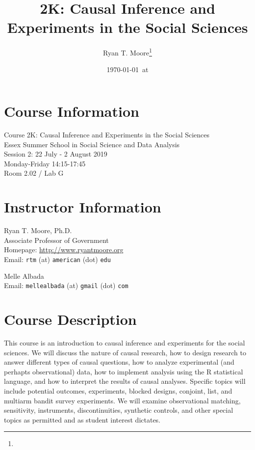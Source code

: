\documentclass[11pt]{article}
\title{2K: Causal Inference and Experiments in the Social Sciences}
\author{Ryan T. Moore\footnote{\rtmaddr}}
\date{\today~at \xxivtime}
\begin{document}
\maketitle

\section*{Course Information}
Course 2K: Causal Inference and Experiments in the Social Sciences\\
Essex Summer School in Social Science and Data Analysis\\
Session 2: 22 July - 2 August 2019\\
Monday-Friday 14:15-17:45\\
Room 2.02 / Lab G\\

\section*{Instructor Information}
Ryan T. Moore, Ph.D. \\
Associate Professor of Government\\
Homepage: \url{http://www.ryantmoore.org} \\
Email: {\tt rtm} (at) {\tt american} (dot) {\tt edu} \\

\vspace{.1in}

\noindent Melle Albada\\
Email: {\tt mellealbada} (at) {\tt gmail} (dot) {\tt com} \\


\section*{Course Description}

This course is an introduction to causal inference and experiments for the social sciences.  We will discuss the nature of causal research, how to design research to answer different types of causal questions, how to analyze experimental (and perhapts observational) data, how to implement analysis using the R statistical language, and how to interpret the results of causal analyses.  Specific topics will include potential outcomes, experiments, blocked designs, conjoint, list, and multiarm bandit survey experiments.  We will examine observational matching, sensitivity, instruments, discontinuities, synthetic controls, and other special topics as permitted and as student interest dictates.
\end{document}
